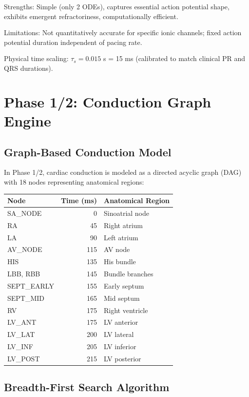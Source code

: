 \documentclass[12pt]{book}
\begin{document}
Strengths: Simple (only 2 ODEs), captures essential action potential shape, exhibits emergent refractoriness, computationally efficient.

Limitations: Not quantitatively accurate for specific ionic channels; fixed action potential duration independent of pacing rate.

Physical time scaling: $\tau_s = 0.015$ s = 15 ms (calibrated to match clinical PR and QRS durations).


\chapter{Phase 1/2: Conduction Graph Engine}

\section{Graph-Based Conduction Model}

In Phase 1/2, cardiac conduction is modeled as a directed acyclic graph (DAG) with 18 nodes representing anatomical regions:

\begin{tabular}{|l|r|l|}
\hline
\textbf{Node} & \textbf{Time (ms)} & \textbf{Anatomical Region} \\
\hline
SA\_NODE & 0 & Sinoatrial node \\
RA & 45 & Right atrium \\
LA & 90 & Left atrium \\
AV\_NODE & 115 & AV node \\
HIS & 135 & His bundle \\
LBB, RBB & 145 & Bundle branches \\
SEPT\_EARLY & 155 & Early septum \\
SEPT\_MID & 165 & Mid septum \\
RV & 175 & Right ventricle \\
LV\_ANT & 175 & LV anterior \\
LV\_LAT & 200 & LV lateral \\
LV\_INF & 205 & LV inferior \\
LV\_POST & 215 & LV posterior \\
\hline
\end{tabular}

\section{Breadth-First Search Algorithm}
\end{document}
